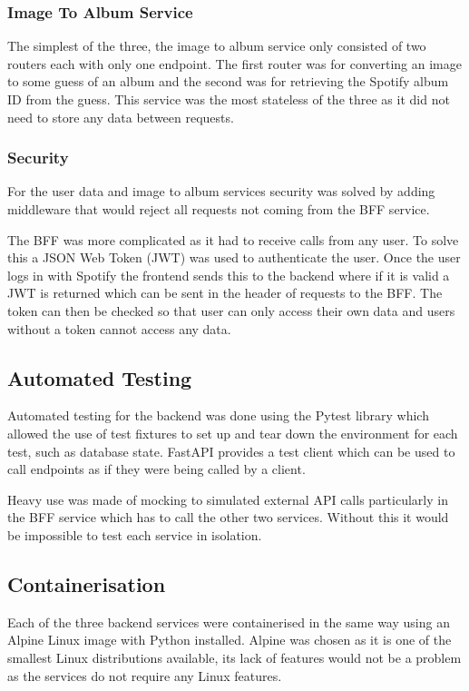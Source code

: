 \subsubsection{Image To Album Service}
The simplest of the three, the image to album service only consisted of two routers each with only one endpoint. The first router was for converting an image to some guess of an album and the second was for retrieving the Spotify album ID from the guess. This service was the most stateless of the three as it did not need to store any data between requests.

\subsubsection{Security}
For the user data and image to album services security was solved by adding middleware that would reject all requests not coming from the BFF service.

The BFF was more complicated as it had to receive calls from any user. To solve this a JSON Web Token (JWT) was used to authenticate the user. Once the user logs in with Spotify the frontend sends this to the backend where if it is valid a JWT is returned which can be sent in the header of requests to the BFF. The token can then be checked so that user can only access their own data and users without a token cannot access any data.

\subsection{Automated Testing}
Automated testing for the backend was done using the Pytest library which allowed the use of test fixtures to set up and tear down the environment for each test, such as database state. FastAPI provides a test client which can be used to call endpoints as if they were being called by a client.

Heavy use was made of mocking to simulated external API calls particularly in the BFF service which has to call the other two services. Without this it would be impossible to test each service in isolation.

\subsection{Containerisation}
Each of the three backend services were containerised in the same way using an Alpine Linux image with Python installed. Alpine was chosen as it is one of the smallest Linux distributions available, its lack of features would not be a problem as the services do not require any Linux features.

